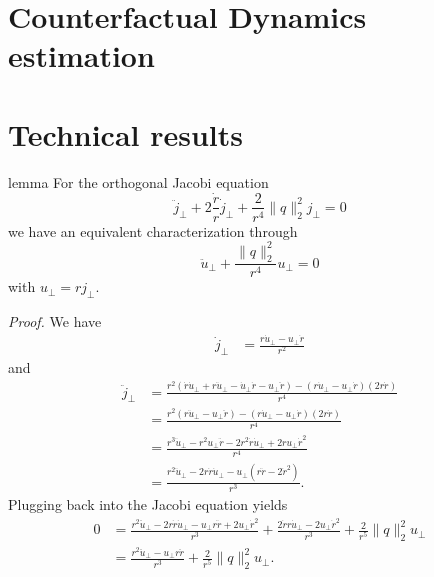 \documentclass{article}
\begin{document}
\section{Counterfactual Dynamics estimation}



\appendix

\section{Technical results}

\begin{restatable}{lemma}{} \label{lemma: orthog jacobi equation}
    For the orthogonal Jacobi equation
    \begin{equation}
        \ddot j_{\perp} +  2\frac{\dot r}{r}\dot j_{\perp} + \frac{2}{r^4}\|q\|_2^2j_{\perp} = 0
    \end{equation}
    we have an equivalent characterization through
    \begin{equation}
        \ddot u_{\perp} + \frac{\|q\|_2^2}{r^4}u_\perp = 0
    \end{equation}
    with $u_\perp = rj_{\perp}$.
\end{restatable}
\noindent \textit{Proof.} We have
\begin{align}
    \dot j_{\perp} &= \frac{r\dot u_{\perp} - u_\perp \dot r}{r^2}
\end{align}
and 
\begin{align}
    \ddot j_{\perp} &= \frac{r^2(\dot r\dot u_{\perp} + r \ddot u_{\perp} - \dot u_\perp \dot r - u_\perp \ddot r) - (r\dot u_{\perp} - u_\perp \dot r)(2r\dot r)}{r^4} \\
    &= \frac{r^2(r \ddot u_{\perp} - u_\perp \ddot r) - (r\dot u_{\perp} - u_\perp \dot r)(2r\dot r)}{r^4} \\
    &= \frac{r^3 \ddot u_{\perp} - r^2u_\perp \ddot r - 2r^2\dot r\dot u_{\perp} + 2ru_\perp \dot r^2}{r^4} \\
    &= \frac{r^2 \ddot u_{\perp} - 2r\dot r\dot u_{\perp}- u_\perp\left(r \ddot r - 2 \dot r^2\right)}{r^3}.
\end{align}
Plugging back into the Jacobi equation yields
\begin{align}
    0 &= \frac{r^2 \ddot u_{\perp} - 2r\dot r\dot u_{\perp}- u_\perp r\ddot r + 2 u_{\perp}\dot r^2}{r^3} + \frac{2\dot rr\dot u_{\perp} - 2u_\perp \dot r^2}{r^3} + \frac{2}{r^5}\|q\|_2^2u_{\perp} \\
    &= \frac{r^2 \ddot u_{\perp} - u_\perp r\ddot r}{r^3} + \frac{2}{r^5}\|q\|_2^2u_{\perp}.
\end{align}
\end{document}
